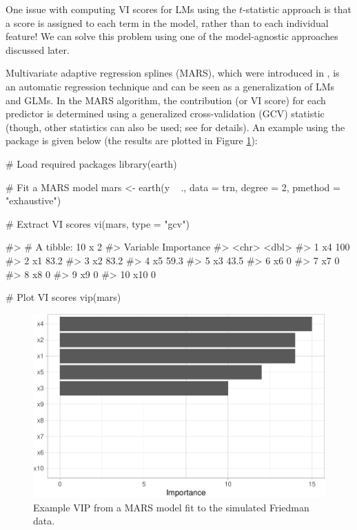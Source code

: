 One issue with computing VI scores for LMs using the \(t\)-statistic
approach is that a score is assigned to each term in the model, rather
than to each individual feature! We can solve this problem using one of
the model-agnostic approaches discussed later.

Multivariate adaptive regression splines (MARS), which were introduced
in \citet{multivariate-friedman-1991}, is an automatic regression
technique and can be seen as a generalization of LMs and GLMs. In the
MARS algorithm, the contribution (or VI score) for each predictor is
determined using a generalized cross-validation (GCV) statistic (though,
other statistics can also be used; see  for
details). An example using the  package \citep{earth-pkg}
is given below (the results are plotted in Figure \ref{fig:vip-earth}):

\begin{Schunk}
\begin{Sinput}
# Load required packages
library(earth)

# Fit a MARS model
mars <- earth(y ~ ., data = trn, degree = 2, pmethod = "exhaustive")

# Extract VI scores
vi(mars, type = "gcv")
\end{Sinput}
\begin{Soutput}
#> # A tibble: 10 x 2
#>    Variable Importance
#>    <chr>         <dbl>
#>  1 x4            100  
#>  2 x1             83.2
#>  3 x2             83.2
#>  4 x5             59.3
#>  5 x3             43.5
#>  6 x6              0  
#>  7 x7              0  
#>  8 x8              0  
#>  9 x9              0  
#> 10 x10             0
\end{Soutput}
\begin{Sinput}
# Plot VI scores
vip(mars)
\end{Sinput}
\begin{figure}[!htb]

{\centering \includegraphics[width=0.7\linewidth]{greenwell-boehmke_files/figure-latex/vip-earth-1} 

}

\caption[Example VIP from a MARS model fit to the simulated Friedman data]{Example VIP from a MARS model fit to the simulated Friedman data.}\label{fig:vip-earth}
\end{figure}
\end{Schunk}

